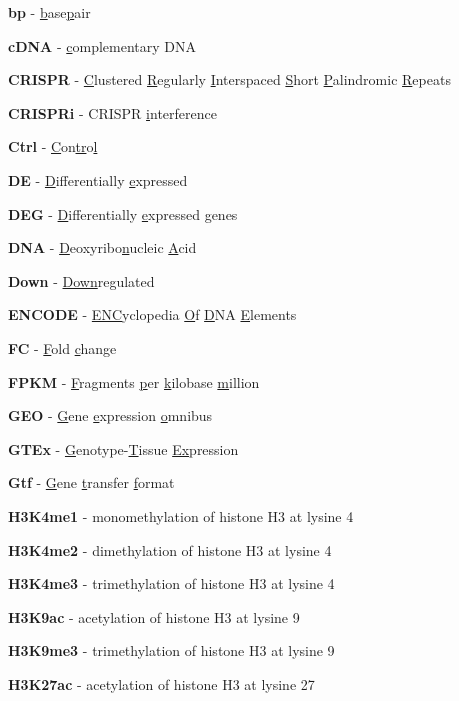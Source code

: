 \begin{scriptsize}
  \begin{myitemize}
  \item[] \textbf{bp} - \underline{b}ase\underline{p}air
  \item[] \textbf{cDNA} - \underline{c}omplementary DNA
  \item[] \textbf{CRISPR} - \underline{C}lustered \underline{R}egularly \underline{I}nterspaced \underline{S}hort \underline{P}alindromic \underline{R}epeats  
  \item[] \textbf{CRISPRi} - CRISPR \underline{i}nterference
  \item[] \textbf{Ctrl} - \underline{C}on\underline{t}\underline{r}o\underline{l}
  \item[] \textbf{DE} - \underline{D}ifferentially \underline{e}xpressed
  \item[] \textbf{DEG} - \underline{D}ifferentially \underline{e}xpressed \underline{g}enes
  \item[] \textbf{DNA} - \underline{D}eoxyribo\underline{n}ucleic \underline{A}cid
  \item[] \textbf{Down} - \underline{Down}regulated
  \item[] \textbf{ENCODE} - \underline{ENC}yclopedia \underline{O}f \underline{D}NA \underline{E}lements
  \item[] \textbf{FC} - \underline{F}old \underline{c}hange
  \item[] \textbf{FPKM} - \underline{F}ragments \underline{p}er \underline{k}ilobase \underline{m}illion
  \item[] \textbf{GEO} - \underline{G}ene \underline{e}xpression \underline{o}mnibus
  \item[] \textbf{GTEx} - \underline{G}enotype-\underline{T}issue \underline{Ex}pression
  \item[] \textbf{Gtf} - \underline{G}ene \underline{t}ransfer \underline{f}ormat
  \item[] \textbf{H3K4me1} - monomethylation of histone H3 at lysine 4
  \item[]\textbf{H3K4me2} - dimethylation of histone H3 at lysine 4
  \item[]\textbf{H3K4me3} - trimethylation of histone H3 at lysine 4
  \item[]\textbf{H3K9ac} - acetylation of histone H3 at lysine 9
  \item[]\textbf{H3K9me3} - trimethylation of histone H3 at lysine 9
  \item[] \textbf{H3K27ac} - acetylation of histone H3 at lysine 27

\end{myitemize}
\end{scriptsize}
